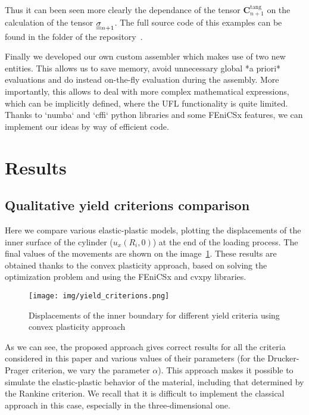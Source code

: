 \documentclass[12pt]{article}
\begin{document}
Thus it can been seen more clearly the dependance of the tensor $\mathbf{C}^\text{tang}_{n+1}$ on the calculation of the tensor $\underline{\underline{\sigma}}_{n+1}$. The full source code of this examples can be found in the  folder of the repository~\parencite{convex-plasticity}.

Finally we developed our own custom assembler which makes use of two new entities. This allows us to save memory, avoid unnecessary global *a priori* evaluations and do instead on-the-fly evaluation during the assembly. More importantly, this allows to deal with more complex mathematical expressions, which can be implicitly defined, where the UFL functionality is quite limited. Thanks to `numba` and `cffi` python libraries and some FEniCSx features, we can implement our ideas by way of efficient code. 

\newpage
\section{Results}
\label{sec:results}

\subsection{Qualitative yield criterions comparison}

Here we compare various elastic-plastic models, plotting the displacements of the inner surface of the cylinder ($u_x(R_i, 0)$) at the end of the loading process. The final values of the movements are shown on the image~\ref{fig:yield_criteria}. These results are obtained thanks to the convex plasticity approach, based on solving the optimization problem and using the FEniCSx and cvxpy libraries.
\begin{figure}[H]
    \center
    \texttt{[image: img/yield\_criterions.png]}
    \caption{Displacements of the inner boundary for different yield criteria using convex plasticity approach}
    \label{fig:yield_criteria}
\end{figure}
As we can see, the proposed approach gives correct results for all the criteria considered in this paper and various values of their parameters (for the Drucker-Prager criterion, we vary the parameter $\alpha$). This approach makes it possible to simulate the elastic-plastic behavior of the material, including that determined by the Rankine criterion. We recall that it is difficult to implement the classical approach in this case, especially in the three-dimensional one.
\end{document}

